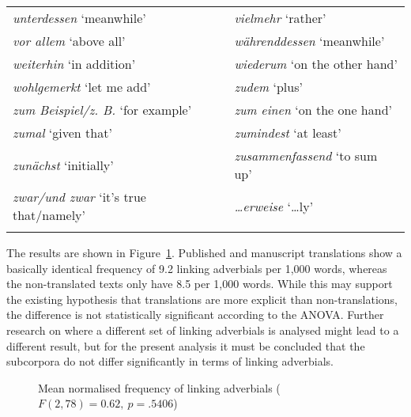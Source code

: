 \documentclass[output=paper]{LSP/langsci}
\begin{document}
\begin{table}
\begin{tabularx}{\textwidth}{QQ}
    \emph{unterdessen} `meanwhile' & \emph{vielmehr} `rather'\\
    \emph{vor allem} `above all' & \emph{währenddessen} `meanwhile'\\
    \emph{weiterhin} `in addition' & \emph{wiederum} `on the other hand'\\
    \emph{wohlgemerkt} `let me add' & \emph{zudem} `plus'\\
    \emph{zum Beispiel/z. B.} `for example' & \emph{zum einen} `on the one hand'\\
    \emph{zumal} `given that' & \emph{zumindest} `at least'\\
    \emph{zunächst} `initially' & \emph{zusammenfassend} `to sum up'\\
    \emph{zwar\slash und zwar} `it's true that\slash namely' & \emph{\dots erweise} `\dots ly'\\
    \lspbottomrule
  \end{tabularx}
\end{table}

The results are shown in Figure~\ref{bisiada:fig:linadv}. Published and manuscript translations show a basically identical frequency of 9.2 linking adverbials per 1,000 words, whereas the non-translated texts only have 8.5 per 1,000 words. While this may support the existing hypothesis that translations are more explicit than non-translations, the difference is not statistically significant according to the ANOVA. Further research on  where a different set of linking adverbials is analysed might lead to a different result, but for the present analysis it must be concluded that the subcorpora do not differ significantly in terms of linking adverbials.

\begin{figure}
  \caption{Mean normalised frequency of linking adverbials ($F(2,78)=0.62,~p=.5406$)}\label{bisiada:fig:linadv}
\end{figure}
\end{document}
